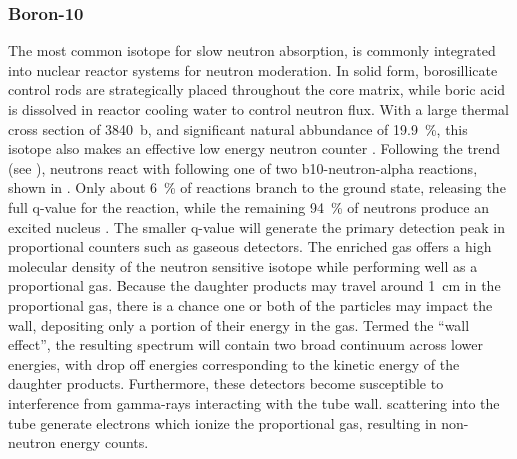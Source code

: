 \documentclass[../../../../main.tex]{subfiles}%
\begin{document}
%
    \subsubsection{Boron-10}%
    \label{sec:chapter-2:radiation-detection:neutron-interactions:boron-10}%
    The most common isotope for slow neutron absorption,  is commonly integrated into nuclear reactor systems for neutron moderation.
    In solid form, borosillicate control rods are strategically placed throughout the core matrix, while boric acid is dissolved in reactor cooling water to control neutron flux.  
    With a large thermal cross section of \SI{3840}{\barn}, and significant natural abbundance of \SI{19.9}{\percent}, this isotope also makes an effective low energy neutron counter \cite{Chadwick_2011}.
    Following the  trend (see ), neutrons react with  following one of two \gls{b10-neutron-alpha} reactions, shown in .
    Only about \SI{6}{\percent} of reactions branch to the ground state, releasing the full \gls{q-value} for the reaction, while the remaining \SI{94}{\percent} of neutrons produce an excited \Xmath{^*} nucleus \cite{book:Knoll_2010}.
    The smaller \gls{q-value} will generate the primary detection peak in proportional counters such as  gaseous detectors.
    The  enriched gas offers a high molecular density of the neutron sensitive isotope while performing well as a proportional gas.
    Because the daughter products may travel around \SI{1}{\centi\meter} in the proportional gas, there is a chance one or both of the particles may impact the wall, depositing only a portion of their energy in the gas.
    Termed the ``wall effect'', the resulting spectrum will contain two broad continuum across lower energies, with drop off energies corresponding to the kinetic energy of the daughter products.
    Furthermore, these detectors become susceptible to interference from \glspl{gamma-ray} interacting with the tube wall.
     scattering into the tube generate electrons which ionize the proportional gas, resulting in non-neutron energy counts.
\end{document}

